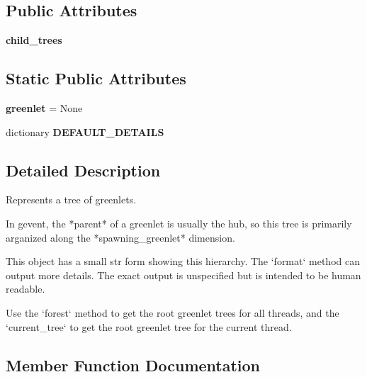 \subsection*{Public Attributes}
\begin{DoxyCompactItemize}
\item 
\mbox{\label{classgevent_1_1util_1_1_greenlet_tree_ab10f7d05551e671b8fccb3c1a2e0a21e}} 
{\bfseries child\+\_\+trees}
\end{DoxyCompactItemize}
\subsection*{Static Public Attributes}
\begin{DoxyCompactItemize}
\item 
\mbox{\label{classgevent_1_1util_1_1_greenlet_tree_afa5798c68c6ed2bbebbb35e631fd70f3}} 
{\bfseries greenlet} = None
\item 
dictionary {\bfseries D\+E\+F\+A\+U\+L\+T\+\_\+\+D\+E\+T\+A\+I\+LS}
\end{DoxyCompactItemize}


\subsection{Detailed Description}
\begin{DoxyVerb}Represents a tree of greenlets.

In gevent, the *parent* of a greenlet is usually the hub, so this
tree is primarily arganized along the *spawning_greenlet* dimension.

This object has a small str form showing this hierarchy. The `format`
method can output more details. The exact output is unspecified but is
intended to be human readable.

Use the `forest` method to get the root greenlet trees for
all threads, and the `current_tree` to get the root greenlet tree for
the current thread.
\end{DoxyVerb}
 

\subsection{Member Function Documentation}
\mbox{\label{classgevent_1_1util_1_1_greenlet_tree_a6c56ec6e4983c6a7046b1ace698a0a7d}} 
